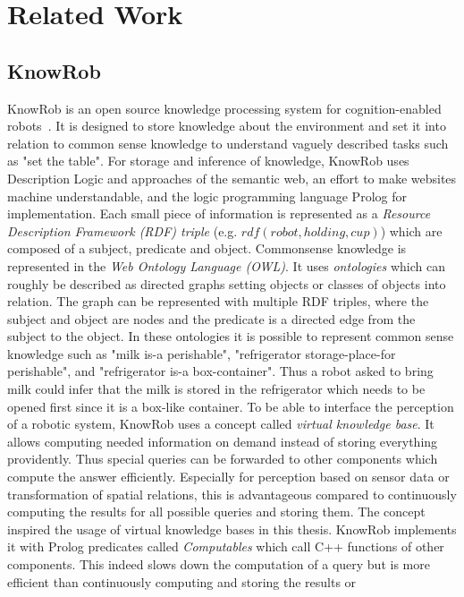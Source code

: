 \documentclass[a4paper,11pt]{article}
\begin{document}
\section{Related Work}
\label{sec:related}
\subsection{KnowRob}
\label{sec:knowrob}
KnowRob is an open source knowledge processing system for
cognition-enabled robots~\cite{KnowRob,KnowRob-Representation}. It is
designed to store knowledge about the environment and set it into
relation to common sense knowledge to understand vaguely described
tasks such as "set the table". For storage and inference of knowledge,
KnowRob uses Description Logic and approaches of the semantic web, an
effort to make websites machine understandable, and the logic
programming language Prolog for implementation. Each small piece of
information is represented as a \emph{Resource Description Framework
  (RDF) triple} (e.g. $rdf(robot, holding, cup)$) which are composed
of a subject, predicate and object. Commonsense knowledge is
represented in the \emph{Web Ontology Language (OWL)}. It uses
\emph{ontologies} which can roughly be described as directed graphs
setting objects or classes of objects into relation. The graph can be
represented with multiple RDF triples, where the subject and object
are nodes and the predicate is a directed edge from the subject to the
object. In these ontologies it is possible to represent common sense
knowledge such as "milk is-a perishable", "refrigerator
storage-place-for perishable", and "refrigerator is-a
box-container". Thus a robot asked to bring milk could infer that the
milk is stored in the refrigerator which needs to be opened first
since it is a box-like container.  To be able to interface the
perception of a robotic system, KnowRob uses a concept called
\emph{virtual knowledge base}. It allows computing needed information
on demand instead of storing everything providently. Thus special
queries can be forwarded to other components which compute the answer
efficiently. Especially for perception based on sensor data or
transformation of spatial relations, this is advantageous compared
to continuously computing the results for all possible queries and
storing them. The concept inspired the usage of virtual knowledge
bases in this thesis. KnowRob implements it with Prolog predicates
called \emph{Computables} which call C++ functions of other
components. This indeed slows down the computation of a query but is
more efficient than continuously computing and storing the results or
\end{document}
